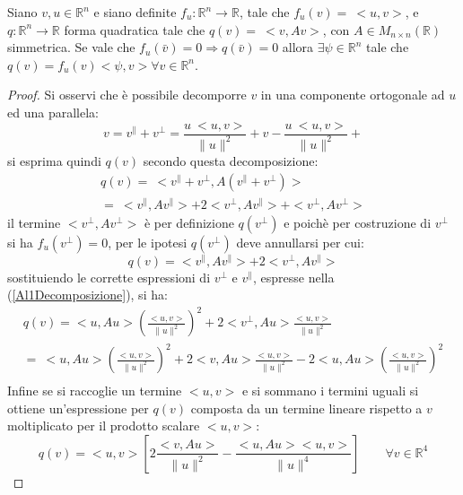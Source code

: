 \begin{lemma}
    Siano $v,u\in \mathbb{R}^n$ e siano definite $f_u: \mathbb{R}^n\rightarrow\mathbb{R}$, 
    tale che $f_u(v)=\ <u,v>$, e $q:\mathbb{R}^n\rightarrow\mathbb{R}$ forma quadratica tale che $q
    (v)=\ <v,Av>$, con $A\in M_{n\times n}(\mathbb{R})$ simmetrica. Se vale che $f_u(\bar{v})=0 \Rightarrow q(\bar{v})=0$
    allora $\exists \psi\in \mathbb{R}^n$ tale che $q(v)=f_u(v)<\psi,v> \forall v\in \mathbb{R}^n$.
    \label{lemm:A1}
\end{lemma}
\begin{proof}
    Si osservi che è possibile decomporre $v$ in una componente
    ortogonale ad $u$ ed una parallela:
    \begin{equation}
        v=v^\parallel +v^\bot =\frac{u\ <u,v>}{\|u\|^2}+v-\frac{u\ <u,v>}{\|u\|^2}+
    \label{Al1Decomposizione}
    \end{equation}  
    si esprima quindi $q(v)$ secondo questa decomposizione:
    \begin{equation*}
        \begin{gathered}
            q(v)=\ <v^\parallel +v^\bot,A(v^\parallel +v^\bot)>\\
            =\ <v^\parallel ,Av^\parallel >+2<v^\bot,Av^\parallel>+<v^\bot,Av^\bot>
        \end{gathered}
    \end{equation*}
    il termine $<v^\bot,Av^\bot>$ è per definizione $q(v^\bot)$ e poichè 
    per costruzione di $v^\bot$ si ha $f_u(v^\bot)=0$, per le ipotesi $q(v^\bot)$
    deve annullarsi per cui:
   \begin{equation*}
    q(v)=<v^\parallel ,Av^\parallel >+2<v^\bot,Av^\parallel>
   \end{equation*}
   sostituiendo le corrette espressioni di $v^\bot$ e $v^\parallel$, espresse nella (\ref{Al1Decomposizione}), si ha:
   \begin{equation*}
    \begin{gathered}
        q(v)=<u ,Au >\left(\frac{<u,v>}{\|u\|^2} \right)^2 +2 <v^\bot,Au> \frac{<u,v>}{\|u\|^2}\\
        =\ <u ,Au >\left(\frac{<u,v>}{\|u\|^2} \right)^2 +2 <v,Au> \frac{<u,v>}{\|u\|^2} -2<u ,Au >\left(\frac{<u,v>}{\|u\|^2} \right)^2\\
    \end{gathered}
   \end{equation*}
   Infine se si raccoglie un termine $<u,v>$ e si sommano i termini uguali si ottiene un'espressione per $q(v)$ composta da un termine lineare 
   rispetto a $v$ moltiplicato per il prodotto scalare $<u,v>$:
   \begin{equation}
    q(v)=<u,v>\left[2 \frac{<v,Au>}{\|u\|^2}-\frac{<u ,Au ><u,v>}{\|u\|^4} \right] \qquad \forall v\in\mathbb{R}^4
   \end{equation}
\end{proof}

